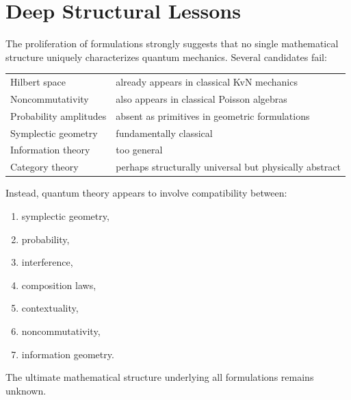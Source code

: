 \section{Deep Structural Lessons}
The proliferation of formulations strongly suggests that no single mathematical structure uniquely characterizes quantum mechanics.
Several candidates fail:
\begin{center}
\begin{tabular}{ll}
Hilbert space & already appears in classical KvN mechanics \\
Noncommutativity & also appears in classical Poisson algebras \\
Probability amplitudes & absent as primitives in geometric formulations \\
Symplectic geometry & fundamentally classical \\
Information theory & too general \\
Category theory & perhaps structurally universal but physically abstract
\end{tabular}
\end{center}
Instead, quantum theory appears to involve compatibility between:
\begin{enumerate}
\item symplectic geometry,
\item probability,
\item interference,
\item composition laws,
\item contextuality,
\item noncommutativity,
\item information geometry.
\end{enumerate}
The ultimate mathematical structure underlying all formulations remains unknown.
